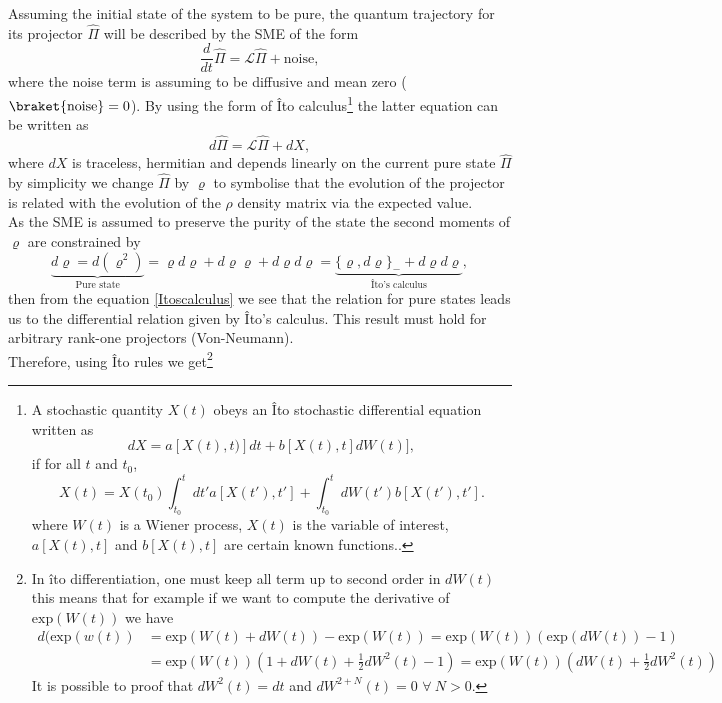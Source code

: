 Assuming the initial state of the system to be pure, the quantum trajectory for its projector $\hat{\Pi}$ will be described by the SME of the form
\[\frac{d}{dt}\hat{\Pi}=\mathcal{L}\hat{\Pi}+\text{noise},\]
where the noise term is assuming to be diffusive and mean zero ($\braket{\text{noise}}=0$). By using the form of Îto calculus\footnote{A stochastic quantity $X(t)$ obeys an \^{I}to stochastic differential equation written as
\[dX=a[X(t),t)]dt+b[X(t),t]dW(t)],\]
if for all $t$ and $t_0$,
\[X(t)=X(t_0)\int_{t_{0}}^{t}dt'a[X(t'),t']+\int_{t_0}^{t}dW(t')b[X(t'),t'].\]
where $W(t)$ is a Wiener process, $X(t)$ is the variable of interest, $a[X(t),t]$ and $b[X(t),t]$ are certain known functions.\cite{StochasticNumerics}\cite{StochasticMethods}.} the latter equation can be written as
\begin{equation}
d\hat{\Pi}=\mathcal{L}\hat{\Pi}+dX,
\label{Itoform}
\end{equation}
where $dX$ is traceless, hermitian and depends linearly on the current pure state $\hat{\Pi}$ by simplicity we change $\hat{\Pi}$ by $\varrho$ to symbolise that the evolution of the projector is related with the evolution of the $\rho$ density matrix via the expected value.\\
As the SME is assumed to preserve the purity of the state the second moments of $\varrho$ are constrained by
\begin{equation}
\underbrace{d\varrho=d(\varrho^2)}_{\text{Pure state}}=\varrho d\varrho + d\varrho \varrho+d\varrho d\varrho =\underbrace{\{\varrho,d\varrho \}_{-}+d\varrho d\varrho}_{\text{Îto's calculus}},
\label{Itoscalculus}
\end{equation}
then from the equation \eqref{Itoscalculus} we see that the relation for pure states leads us to the differential relation given by Îto's calculus. This result must hold for arbitrary rank-one projectors (Von-Neumann).\\
Therefore, using Îto rules we get\footnote{In îto differentiation, one must keep all term up to second order in $dW(t)$ this means that for example if we want to compute the derivative of $\text{exp}(W(t))$ we have
\begin{align*}
d(\text{exp}(w(t))&=\text{exp}(W(t)+dW(t))-\text{exp}(W(t))=\text{exp}(W(t))\left(\text{exp}(dW(t))-1\right)\\
&=\text{exp}(W(t))\left(1+dW(t)+\frac{1}{2}dW^2(t)-1\right)=\text{exp}(W(t))\left(dW(t)+\frac{1}{2}dW^2(t)\right)
\end{align*}
It is possible to proof that $dW^2(t)=dt$ and $dW^{2+N}(t)=0$ $\forall \ N>0$.\cite{gardiner2004handbook}}

